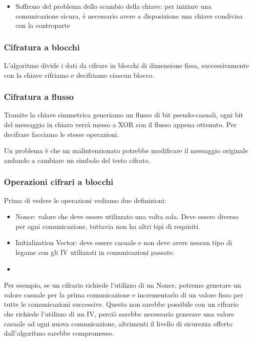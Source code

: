 \begin{itemize}
\item
  Soffrono del problema dello scambio della chiave: per iniziare una
  comunicazione sicura, è necessario avere a disposizione una chiave
  condivisa con la controparte
\end{itemize}

\subsubsection{Cifratura a blocchi}\label{cifratura-a-blocchi}

L'algoritmo divide i dati da cifrare in blocchi di dimensione fissa,
successivamente con la chiave cifriamo e decifriamo ciascun blocco.

\subsubsection{Cifratura a flusso}\label{cifratura-a-flusso}

Tramite la chiave simmetrica generiamo un flusso di bit pseudo-casuali,
ogni bit del messaggio in chiaro verrà messo a XOR con il flusso appena
ottenuto. Per decifrare facciamo le stesse operazioni.

Un problema è che un malintenzionato potrebbe modificare il messaggio
originale andando a cambiare un simbolo del testo cifrato.

\subsubsection{Operazioni cifrari a
blocchi}\label{operazioni-cifrari-a-blocchi}

Prima di vedere le operazioni vediamo due definizioni:

\begin{itemize}
\item
  Nonce: valore che deve essere utilizzato una volta sola. Deve essere
  diverso per ogni comunicazione, tuttavia non ha altri tipi di
  requisiti.
\item
  Initialization Vector: deve essere casuale e non deve avere nessun
  tipo di legame con gli IV utilizzati in comunicazioni passate.
\item
\end{itemize}

Per esempio, se un cifrario richiede l'utilizzo di un Nonce, potremo
generare un valore casuale per la prima comunicazione e incrementarlo di
un valore fisso per tutte le comunicazioni successive. Questo non
sarebbe possibile con un cifrario che richiede l'utilizzo di un IV,
perciò sarebbe necessario generare una valore casuale ad ogni nuova
comunicazione, altrimenti il livello di sicurezza offerto dall'algoritmo
sarebbe compromesso.

